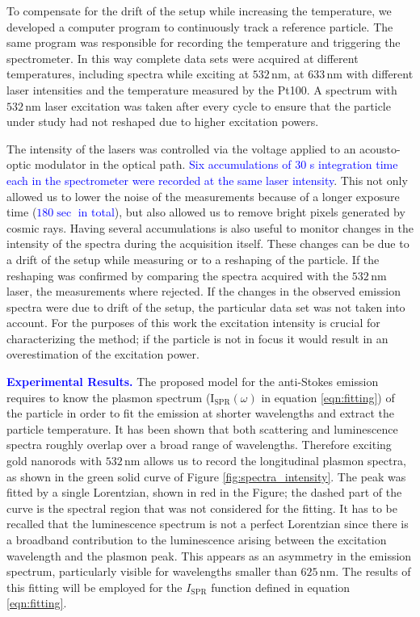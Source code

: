 \documentclass[journal=nalefd,manuscript=letter]{achemso}
\newcommand{\HI}[1]{\textcolor{blue}{#1}} %
\newcommand{\nm}{\ensuremath{\,\textrm{nm}}}
\begin{document}
To compensate for the drift of the setup while increasing the temperature, we
developed a computer program to continuously track a reference particle. The
same program was responsible for recording the temperature and triggering the
spectrometer. In this way complete data sets were acquired at different
temperatures, including spectra while exciting at $532\nm$, at $633\nm$ with
different laser intensities and the temperature measured by the Pt100. A
spectrum with $532\nm$ laser excitation was taken after every cycle to ensure
that the particle under study had not reshaped due to higher excitation powers.

The intensity of the lasers was controlled via the voltage applied to an
acousto-optic modulator in the optical path. \HI{Six accumulations of $30$ s integration time each
in the spectrometer were recorded at the same laser intensity}. This not only allowed us to
lower the noise of the measurements because of a longer exposure time (\HI{$180\sec$ in total}), but also
allowed us to remove bright pixels generated by cosmic rays. Having several
accumulations is also useful to monitor changes in the intensity of the spectra
during the acquisition itself. These changes can be due to a drift of the setup
while measuring or to a reshaping of the particle. If the reshaping was
confirmed by comparing the spectra acquired with the $532\nm$
laser\cite{Liu2009}, the measurements where rejected. If the changes in the
observed emission spectra were due to drift of the setup, the particular data
set was not taken into account. For the purposes of this work the excitation
intensity is crucial for characterizing the method; if the particle is not in
focus it would result in an overestimation of the excitation power. 



\HI{\textbf{Experimental Results.}} The proposed model for the anti-Stokes emission requires to know the plasmon
spectrum ($\textrm{I}_{\textrm{SPR}}(\omega)$ in equation \ref{eqn:fitting}) of
the particle in order to fit the emission at shorter wavelengths and extract the
particle temperature. It has been shown that both scattering and luminescence
spectra roughly overlap over a broad range of wavelengths\cite{Yorulmaz2012}. Therefore
exciting gold nanorods with $532\nm$ allows us to record the longitudinal
plasmon spectra, as shown in the green solid curve of Figure \ref{fig:spectra_intensity}. The
peak was fitted by a single Lorentzian, shown in red in the Figure; the dashed
part of the curve is the spectral region that was not considered for the
fitting. It has to be recalled that the luminescence spectrum is not a perfect
Lorentzian since there is a broadband contribution to the luminescence arising
between the excitation wavelength and the plasmon peak\cite{Boyd1986}. This
appears as an asymmetry in the emission spectrum, particularly visible for
wavelengths smaller than $625\nm$. The results of this fitting will be employed
for the $I_\textrm{SPR}$ function defined in equation \ref{eqn:fitting}. 
\end{document}
